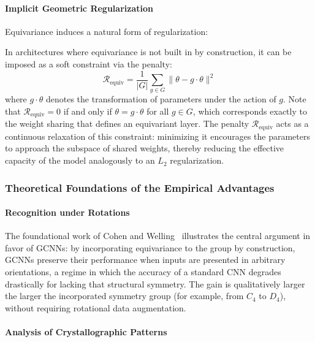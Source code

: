 \paragraph{Implicit Geometric Regularization}

Equivariance induces a natural form of regularization:

\begin{remark}\label{prop:regularizacion_equivarianza}
In architectures where equivariance is not built in by construction, it can be imposed as a soft constraint via the penalty:
\begin{equation}
\mathcal{R}_{\text{equiv}} = \frac{1}{|G|} \sum_{g \in G} \|\theta - g \cdot \theta\|^2
\end{equation}
where $g \cdot \theta$ denotes the transformation of parameters under the action of $g$. Note that $\mathcal{R}_{\text{equiv}} = 0$ if and only if $\theta = g \cdot \theta$ for all $g \in G$, which corresponds exactly to the weight sharing that defines an equivariant layer. The penalty $\mathcal{R}_{\text{equiv}}$ acts as a continuous relaxation of this constraint: minimizing it encourages the parameters to approach the subspace of shared weights, thereby reducing the effective capacity of the model analogously to an $L_2$ regularization.
\end{remark}

\subsubsection{Theoretical Foundations of the Empirical Advantages}

\paragraph{Recognition under Rotations}

The foundational work of Cohen and Welling~\citep{cohen2016groupequivariantconvolutional} illustrates the central argument in favor of \glspl{GCNN}: by incorporating equivariance to the group by construction, \glspl{GCNN} preserve their performance when inputs are presented in arbitrary orientations, a regime in which the accuracy of a standard CNN degrades drastically for lacking that structural symmetry. The gain is qualitatively larger the larger the incorporated symmetry group (for example, from $C_4$ to $D_4$), without requiring rotational data augmentation.

\paragraph{Analysis of Crystallographic Patterns}

